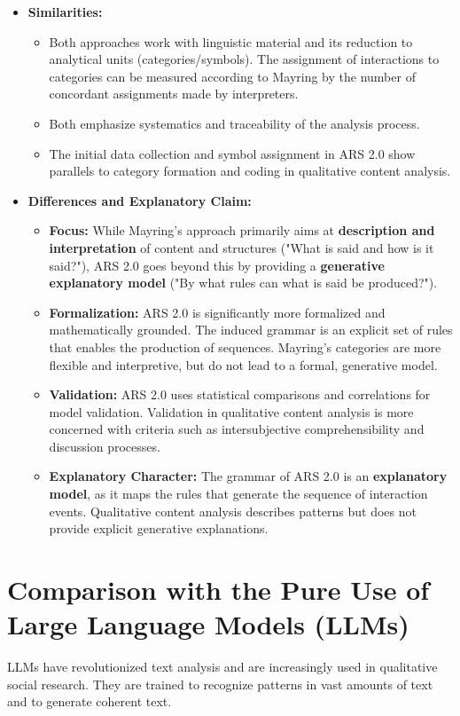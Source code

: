 \documentclass{article}
\begin{document}
\begin{itemize}
    \item \textbf{Similarities:}
    \begin{itemize}
        \item Both approaches work with linguistic material and its reduction to analytical units (categories/symbols). The assignment of interactions to categories can be measured according to Mayring by the number of concordant assignments made by interpreters.
        \item Both emphasize systematics and traceability of the analysis process.
        \item The initial data collection and symbol assignment in ARS 2.0 show parallels to category formation and coding in qualitative content analysis.
    \end{itemize}
    \item \textbf{Differences and Explanatory Claim:}
    \begin{itemize}
        \item \textbf{Focus:} While Mayring's approach primarily aims at \textbf{description and interpretation} of content and structures ("What is said and how is it said?"), ARS 2.0 goes beyond this by providing a \textbf{generative explanatory model} ("By what rules can what is said be produced?").
        \item \textbf{Formalization:} ARS 2.0 is significantly more formalized and mathematically grounded. The induced grammar is an explicit set of rules that enables the production of sequences. Mayring's categories are more flexible and interpretive, but do not lead to a formal, generative model.
        \item \textbf{Validation:} ARS 2.0 uses statistical comparisons and correlations for model validation. Validation in qualitative content analysis is more concerned with criteria such as intersubjective comprehensibility and discussion processes.
        \item \textbf{Explanatory Character:} The grammar of ARS 2.0 is an \textbf{explanatory model}, as it maps the rules that generate the sequence of interaction events. Qualitative content analysis describes patterns but does not provide explicit generative explanations.
    \end{itemize}
\end{itemize}

\section{Comparison with the Pure Use of Large Language Models (LLMs)}
LLMs have revolutionized text analysis and are increasingly used in qualitative social research. They are trained to recognize patterns in vast amounts of text and to generate coherent text.
\end{document}

